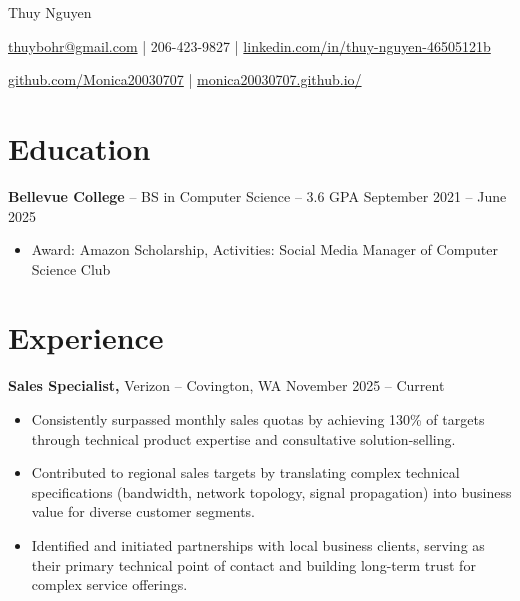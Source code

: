 \documentclass[11pt]{article}       %
\begin{document}
\centerline{\Huge Thuy Nguyen}

\vspace{5pt}

\centerline{\href{mailto:thuybohr@gmail.com}{thuybohr@gmail.com} | 206-423-9827 |
\href{https://www.linkedin.com/in/thuy-nguyen-46505121b/}{linkedin.com/in/thuy-nguyen-46505121b}}

\centerline{\href{https://github.com/Monica20030707}{github.com/Monica20030707} | 
\href{https://monica20030707.github.io/}{monica20030707.github.io/}} 

\vspace{-9pt}

\section*{Education}
\textbf{Bellevue College} -- BS in Computer Science -- 3.6 GPA \hfill September 2021 -- June 2025\\
\vspace{-9pt}
\begin{itemize}
  \item Award: Amazon Scholarship, Activities: Social Media Manager of Computer Science Club
\end{itemize}

\vspace{-18.5pt}

\section*{Experience}

\textbf{Sales Specialist,} {Verizon} -- Covington, WA \hfill November 2025 -- Current \\
\vspace{-9pt}
\begin{itemize}
  \item Consistently surpassed monthly sales quotas by achieving 130\% of targets through technical product expertise and consultative solution-selling.
  \item Contributed to regional sales targets by translating complex technical specifications (bandwidth, network topology, signal propagation) into business value for diverse customer segments.
  \item Identified and initiated partnerships with local business clients, serving as their primary technical point of contact and building long-term trust for complex service offerings.
\end{itemize}
\end{document}
